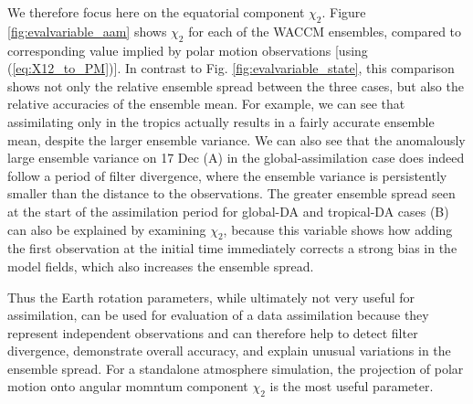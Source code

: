 We therefore focus here on the equatorial component $\chi_2$.
Figure \ref{fig:evalvariable_aam} shows $\chi_2$ for each of the WACCM ensembles, compared to corresponding value implied by polar motion observations [using (\ref{eq:X12_to_PM})]. 
In contrast to Fig. \ref{fig:evalvariable_state}, this comparison shows not only the relative ensemble spread between the three cases, but also the relative accuracies of the ensemble mean. 
For example, we can see that assimilating only in the tropics actually results in a fairly accurate ensemble mean, despite the larger ensemble variance. 
We can also see that the anomalously large ensemble variance on 17 Dec (A) in the global-assimilation case does indeed follow a period of filter divergence, where the ensemble variance is persistently smaller than the distance to the observations. 
The greater ensemble spread seen at the start of the assimilation period for global-DA and tropical-DA cases (B) can also be explained by examining $\chi_2$, because this variable shows how adding the first observation at the initial time immediately corrects 
a strong bias in the model fields, which also increases the ensemble spread. 

Thus the Earth rotation parameters, while ultimately not very useful for assimilation, can be used for evaluation of a data assimilation because they represent independent observations and can therefore help to detect filter divergence, demonstrate overall accuracy, and explain unusual variations in the ensemble spread. 
For a standalone atmosphere simulation, the projection of polar motion onto angular momntum component $\chi_2$ is the most useful parameter. 
